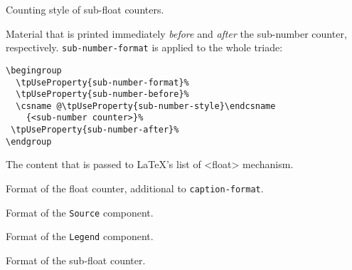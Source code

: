 
Counting style of sub-float counters.


Material that is printed immediately \textit{before} and
\textit{after} the sub-number counter, respectively.
\lstinline{sub-number-format} is applied to the whole triade:
\begin{lstlisting}[style=tex]
\begingroup
  \tpUseProperty{sub-number-format}%
  \tpUseProperty{sub-number-before}%
  \csname @\tpUseProperty{sub-number-style}\endcsname
    {<sub-number counter>}%
 \tpUseProperty{sub-number-after}%
\endgroup
\end{lstlisting}

The content that is passed to \LaTeX's list of <float> mechanism.



Format of the float counter, additional to \lstinline{caption-format}.


Format of the \lstinline{Source} component.


Format of the \lstinline{Legend} component.


Format of the sub-float counter.




